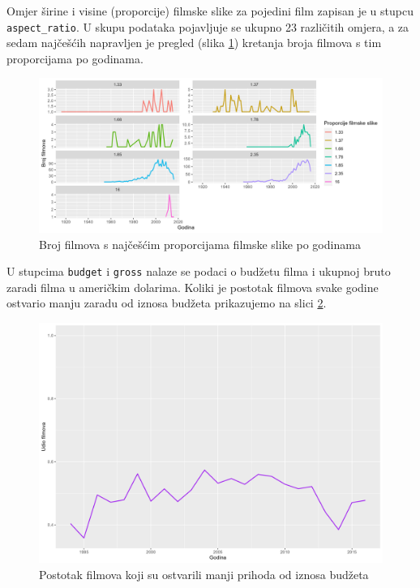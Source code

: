 	 Omjer širine i visine (proporcije) filmske slike za pojedini film zapisan je u stupcu \texttt{aspect\_ratio}. U skupu podataka pojavljuje se ukupno 23 različitih omjera, a za sedam najčešćih napravljen je pregled (slika \ref{proporcije}) kretanja broja filmova s tim proporcijama po godinama. 
	 
	  \begin{figure}[H]
	 	\centering
	 	\includegraphics[width=15cm]{../figures/analysis/proporcije_i_godine.png}
	 	\caption{Broj filmova s najčešćim proporcijama filmske slike po godinama }
	 	\label{proporcije}
	 \end{figure}
	 
	 U stupcima \texttt{budget} i \texttt{gross} nalaze se podaci o budžetu filma i ukupnoj bruto zaradi filma u američkim dolarima. Koliki je postotak filmova svake godine ostvario manju zaradu od iznosa budžeta prikazujemo na slici \ref{neuspjesno}.
	 
	 
	 \begin{figure}[H]
	 	\centering
	 	\includegraphics[width=15cm]{../figures/analysis/prihod_manji_od_budzeta.png}
	 	\caption{Postotak filmova koji su ostvarili manji prihoda od iznosa budžeta}
	 	\label{neuspjesno}
	 \end{figure}
	 
